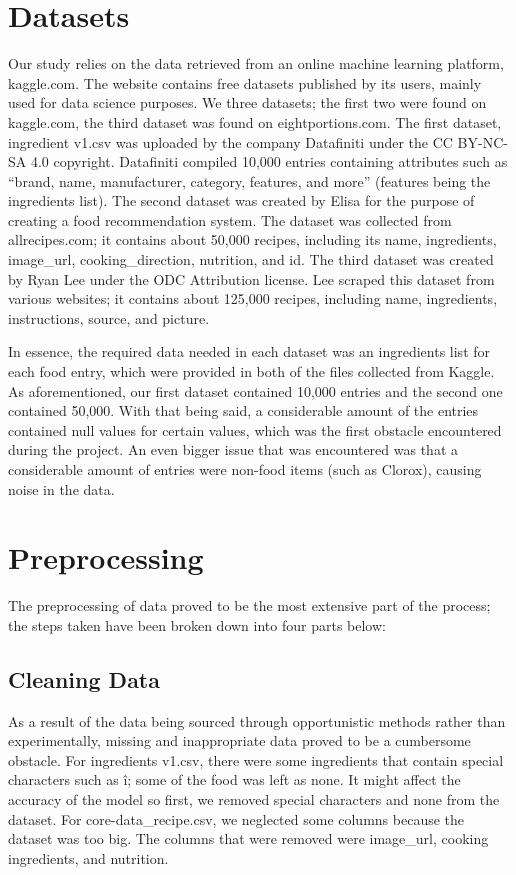 \documentclass[twocolumn]{article}
\begin{document}
\section{Datasets}

Our study relies on the data retrieved from an online machine learning platform, kaggle.com. The website contains free datasets published by its users, mainly used for data science purposes. We three datasets; the first two were found on kaggle.com, the third dataset was found on eightportions.com. The first dataset, ingredient v1.csv was uploaded by the company Datafiniti under the CC BY-NC-SA 4.0 copyright. Datafiniti compiled 10,000 entries containing attributes such as “brand, name, manufacturer, category, features, and more” (features being the ingredients list). The second dataset was created by Elisa for the purpose of creating a food recommendation system. The dataset was collected from allrecipes.com; it contains about 50,000 recipes, including its name, ingredients, image\_url, cooking\_direction, nutrition, and id. The third dataset was created by Ryan Lee under the ODC Attribution license. Lee scraped this dataset from various websites; it contains about 125,000 recipes, including name, ingredients, instructions, source, and picture. 

In essence, the required data needed in each dataset was an ingredients list for each food entry, which were provided in both of the files collected from Kaggle. As aforementioned, our first dataset contained 10,000 entries and the second one contained 50,000. With that being said, a considerable amount of the entries contained null values for certain values, which was the first obstacle encountered during the project. An even bigger issue that was encountered was that a considerable amount of entries were non-food items (such as Clorox), causing noise in the data.  

\section{Preprocessing}
The preprocessing of data proved to be the most extensive part of the process; the steps taken have been broken down into four parts below:
\subsection{Cleaning Data}
As a result of the data being sourced through opportunistic methods rather than experimentally, missing and inappropriate data proved to be a cumbersome obstacle. For ingredients v1.csv, there were some ingredients that contain special characters such as \^i; some of the food was left as none. It might affect the accuracy of the model so first, we removed special characters and none from the dataset. For core-data\_recipe.csv, we neglected some columns because the dataset was too big. The columns that were removed were image\_url, cooking ingredients, and nutrition.
\end{document}
